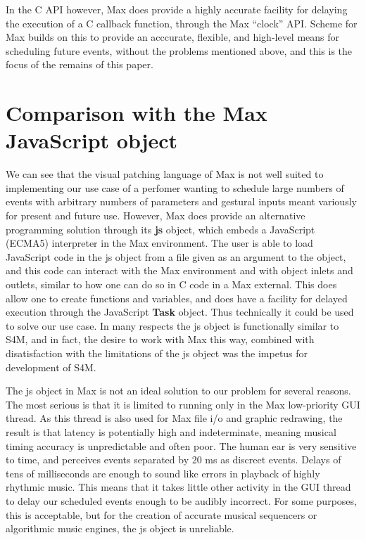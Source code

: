 \documentclass[acmsmall]{acmart}
\begin{document}
In the C API however, Max does provide a highly accurate facility for delaying
the execution of a C callback function, through the Max ``clock'' API. Scheme
for Max builds on this to provide an acccurate, flexible, and high-level means 
for scheduling future events, without the problems mentioned above, and this 
is the focus of the remains of this paper.


\section{Comparison with the Max JavaScript object}

We can see that the visual patching language of Max is not well suited to implementing
our use case of a perfomer wanting to schedule large numbers of events with arbitrary numbers of
parameters and gestural inputs meant variously for present and future use. 
However, Max does provide an alternative programming solution through its
\textbf{js} object, which embeds a JavaScript (ECMA5) interpreter in the Max environment.
The user is able to load JavaScript code in the js object from a file given as an argument to the object,
and this code can interact with the Max environment and with object inlets and outlets,
similar to how one can do so in C code in a Max external.
This does allow one to create functions and variables, and does have a facility
for delayed execution through the JavaScript \textbf{Task} object. 
Thus technically it could be used to solve our use case.
In many respects the js object is functionally similar to S4M, and in fact, the desire to 
work with Max this way, combined with disatisfaction with the limitations of the js
object was the impetus for development of S4M.

The js object in Max is not an ideal solution to our problem for several reasons. 
The most serious
is that it is limited to running only in the Max low-priority GUI thread. As this
thread is also used for Max file i/o and graphic redrawing, the result is that latency
is potentially high and indeterminate, meaning musical timing accuracy is unpredictable and often poor.
The human ear is very sensitive to time, and perceives events separated by 20 ms as discreet
events. 
Delays of tens of milliseconds are enough to sound like errors in playback
of highly rhythmic music. This means that it takes little other activity in the
GUI thread to delay our scheduled events enough to be audibly incorrect. 
For some purposes, this is acceptable, but for the creation of accurate 
musical sequencers or algorithmic music engines, the js object is unreliable. 
\end{document}
